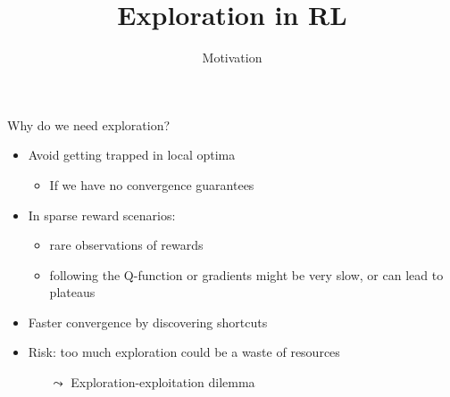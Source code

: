 


\title[RL: Exploration]{Exploration in RL}
\subtitle{Motivation}




	
	\maketitle

\begin{frame}[c]{Why do we need exploration?}

\begin{itemize}
	\item Avoid getting trapped in local optima 
	\begin{itemize}
		\item If we have no convergence guarantees
	\end{itemize}
	\item In sparse reward scenarios:
	\begin{itemize}
		\item rare observations of rewards
		\item following the Q-function or gradients might be very slow, or can lead to plateaus 
	\end{itemize}
	\item Faster convergence by discovering shortcuts
	\bigskip
	\pause
	\item \alert{Risk:} too much exploration could be a waste of resources
	\begin{itemize}
		\item[$\leadsto$] Exploration-exploitation dilemma
	\end{itemize}
\end{itemize}

\end{frame}

